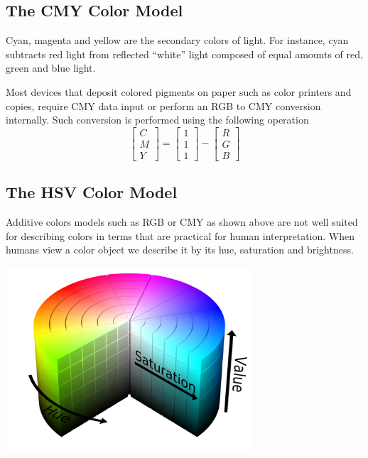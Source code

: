 \documentclass[a4paper,12pt]{article}
\begin{document}
\subsection{The CMY Color Model}
Cyan, magenta and yellow are the secondary colors of light. For instance,
cyan subtracts red light from reflected ``white'' light composed of equal
amounts of red, green and blue light.

Most devices that deposit colored pigments on paper such as color printers
and copies, require CMY data input or perform an RGB to CMY conversion
internally.  Such conversion is performed using the following operation
\[\begin{bmatrix}C\\M\\Y\end{bmatrix}
= \begin{bmatrix}1\\1\\1\end{bmatrix}
- \begin{bmatrix}R\\G\\B\end{bmatrix}\]

\subsection{The HSV Color Model}
Additive colors models such as RGB or CMY as shown above are not well suited
for describing colors in terms that are practical for human interpretation.
When humans view a color object we describe it by its hue, saturation and
brightness.
\begin{center}
  \includegraphics[width=0.69\textwidth]{hsv.png}
\end{center}
\end{document}
